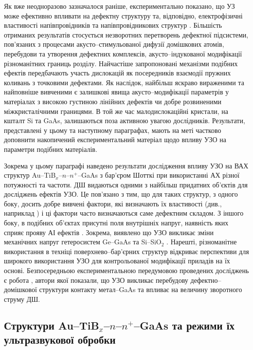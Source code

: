 Як вже неодноразово зазначалося раніше, експериментально показано, що УЗ може ефективно впливати на дефектну структуру та, відповідно, електрофізичні властивості напівпровідників та напівпровідникових структур \cite{Parchinskii2000r,Zaver,OlikhFTT,Parchinskii2003r,Ostrov2002FTPr,UST:SDErmol}.
Більшість отриманих результатів стосується незворотних перетворень  дефектної підсистеми, пов'язаних з процесами акусто--стимульованої дифузії домішкових атомів,  перебудови та утворення дефектних комплексів,  акусто--індукованої модифікації різноманітних границь розділу.
Найчастіше запропоновані механізми подібних ефектів передбачають участь дислокацій як посередників взаємодії пружних коливань з точковими дефектами.
Як наслідок, найбільш яскраво вираженими та найповніше вивченими є залишкові явища акусто--модифікації параметрів у матеріалах з високою густиною лінійних дефектів чи добре розвиненими міжкристалічними границями.
В той же час малодислокаційні кристали, на кшталт Si та GaAs, залишаються поза активною увагою дослідників.
Результати, представлені у цьому та наступному параграфах, мають на меті частково доповнити
накопичений експериментальний матеріал щодо впливу УЗО на параметри подібних матеріалів.

Зокрема у цьому параграфі наведено результати дослідження впливу УЗО
на ВАХ  структур Au--TiB$_x$--$n$--$n^+$--GaAs з бар’єром Шотткі при використанні АХ різної потужності та частоти.
ДШ видаються одними з найбільш придатних об’єктів для досліджень ефектів УЗО.
Це пов’язано з тим, що для таких структур, з одного боку, досить добре вивчені фактори, які визначають їх властивості (див., наприклад \cite{Sze2012,Rhoderick1988,Singh1994,Evstropov2000,PipinsFTP})
і ці фактори часто визначаються саме дефектним складом.
З іншого боку, в подібних об’єктах присутні поля внутрішніх напруг, наявність яких сприяє прояву АІ ефектів \cite{Parchinskii2003r,Ostrov2002FTPr}.
Зокрема, виявлено що УЗО викликає зміни механічних напруг гетеросистем Ge--GaAs та Si--SiO$_2$ \cite{BritunFTT,Zdeb1989}.
Нарешті, різноманітне використання в техніці поверхнево--бар’єрних структур відкриває перспективи для широкого використання УЗО для контрольованої модифікації приладів на їх основі.
Безпосередньою експериментальною передумовою проведених досліджень є робота \cite{UST:SDErmol},
автори якої показали, що УЗО викликає перебудову дефектно--домішкової структури контакту метал--GaAs та впливає на величину зворотного струму ДШ.


\subsection{Структури Au--TiB$_x$--$n$--$n^+$--GaAs та режими їх ультразвукової обробки}


